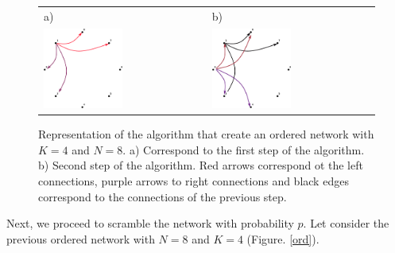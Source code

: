 \documentclass{article}
\begin{document}
\begin{figure}[H]
    \centering
    \begin{tabular}{l l}
        a) & b) \\
        \includegraphics[width=0.5\textwidth]{empty.eps} &
        \includegraphics[width=0.5\textwidth]{empty2.eps}
    \end{tabular}
    \caption{Representation of the algorithm that create an ordered network with $K=4$ and $N=8$. a) Correspond to the first step of the algorithm. b) Second step of the algorithm. Red arrows correspond ot the left connections, purple arrows to right connections and black edges correspond to the connections of the previous step.}
    \label{ordered}
\end{figure}

Next, we proceed to scramble the network with probability $p$. Let consider the previous ordered network with $N=8$ and $K=4$ (Figure. \ref{ord}). 
\end{document}
